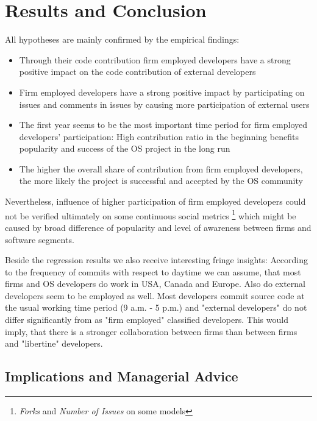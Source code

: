 
\section{Results and Conclusion}
\label{sec:results}

All hypotheses are mainly confirmed by the empirical findings:

\begin{itemize}
  \item Through their code contribution firm employed developers have a strong positive impact on the code contribution of external developers
  \item Firm employed developers have a strong positive impact by participating on issues and comments in issues by causing more participation of external users
  \item The first year seems to be the most important time period for firm employed developers' participation: High contribution ratio in the beginning benefits popularity and success of the OS project in the long run
  \item The higher the overall share of contribution from firm employed developers, the more likely the project is successful and accepted by the OS community
\end{itemize}

Nevertheless, influence of higher participation of firm employed developers could not be verified ultimately on some continuous social metrics \footnote{\textit{Forks} and \textit{Number of Issues} on some models} which might be caused by broad difference of popularity and level of awareness between firms and software segments.

Beside the regression results we also receive interesting fringe insights: According to the frequency of commits with respect to daytime we can assume, that most firms and OS developers do work in USA, Canada and Europe. Also do external developers seem to be employed as well. Most developers commit source code at the usual working time period (9 a.m. - 5 p.m.) and "external developers" do not differ significantly from as "firm employed" classified developers. This would imply, that there is a stronger collaboration between firms than between firms and "libertine" developers.

\subsection{Implications and Managerial Advice}

